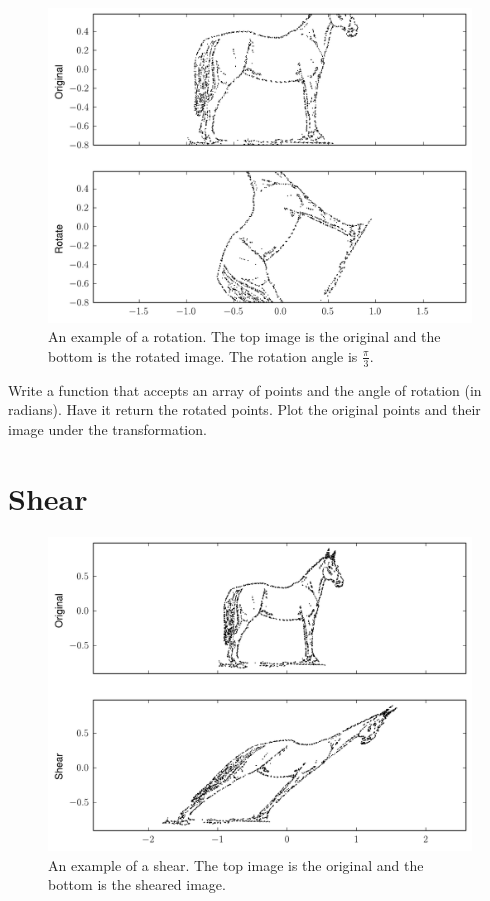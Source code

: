 \begin{figure}
\centering
\includegraphics[width=\textwidth]{rotate.pdf}
\caption{An example of a rotation.
The top image is the original and the bottom is the rotated image.
The rotation angle is $\frac{\pi}{3}$.}
\label{basis:rotate}
\end{figure}

\begin{problem}
Write a function that accepts an array of points and the angle of rotation (in radians). Have it return the rotated points.
Plot the original points and their image under the transformation.
\end{problem}

\section*{Shear}

\begin{figure}
\centering
\includegraphics[width=\textwidth]{shear.pdf}
\caption{An example of a shear.
The top image is the original and the bottom is the sheared image.}
\label{basis:shear}
\end{figure}

